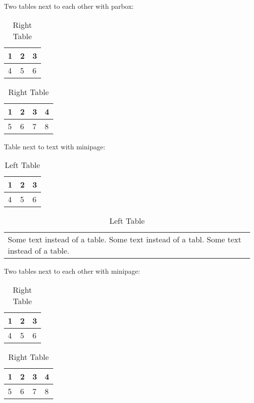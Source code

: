 			Two tables next to each other with parbox:
			\begin{table}[H]
				\parbox{.50\linewidth}{
					\centering
					\begin{tabular}{|l|l|l|}
						\hline
						1 & 2 & 3 \\
						\hline
						4 & 5 & 6 \\
						\hline
					\end{tabular}
					\caption{Left Table}}
				\hfill
				\parbox{.50\linewidth}{
					\centering
					\begin{tabular}{|l|l|l|l|}
						\hline
						1 & 2 & 3 & 4 \\
						\hline
						5 & 6 & 7 & 8 \\
						\hline
					\end{tabular}
					\caption{Right Table}}
			\end{table}
			
			\noindent
			Table next to text with minipage: \noindent
			\begin{table}[H]
				\begin{minipage}[t]{0.5\textwidth}
					\centering
					\begin{tabular}{|l|l|l|}
						\hline
						1 & 2 & 3 \\
						\hline
						4 & 5 & 6 \\
						\hline
					\end{tabular}
					\caption{Left Table}
				\end{minipage}
				\hfill
				\begin{minipage}[t]{0.5\textwidth}
					\begin{tabular}{p{\linewidth}}
						Some text instead of a table. Some text instead of a tabl. Some text instead of a table.
					\end{tabular}
				\end{minipage}
			\end{table}
			
			\noindent
			Two tables next to each other with minipage:
			\begin{table}[H]
				\centering
				\begin{minipage}[t]{0.45\textwidth}
					\centering
					\begin{tabular}{|l|l|l|}
						\hline
						1 & 2 & 3 \\
						\hline
						4 & 5 & 6 \\
						\hline
					\end{tabular}
					\caption{Left Table}
				\end{minipage}
				\hfill
				\begin{minipage}[t]{0.5\textwidth}
					\centering
					\begin{tabular}{|l|l|l|l|}
						\hline
						1 & 2 & 3 & 4 \\
						\hline
						5 & 6 & 7 & 8 \\
						\hline
					\end{tabular}
					\caption{Right Table}
				\end{minipage}
			\end{table}
			
